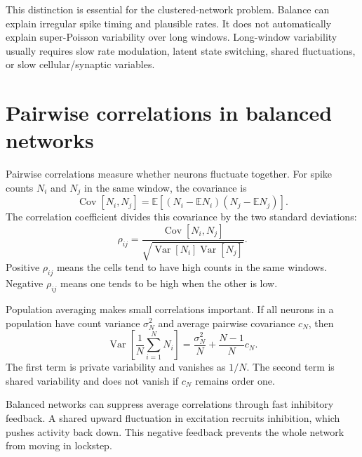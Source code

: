 This distinction is essential for the clustered-network problem. Balance can explain irregular spike timing and plausible rates. It does not automatically explain super-Poisson variability over long windows. Long-window variability usually requires slow rate modulation, latent state switching, shared fluctuations, or slow cellular/synaptic variables.

\section{Pairwise correlations in balanced networks}
\label{sec:pairwise-correlations-balanced}

Pairwise correlations measure whether neurons fluctuate together. For spike counts $N_i$ and $N_j$ in the same window, the covariance is
%
\begin{equation}
  \operatorname{Cov}[N_i,N_j]
  =
  \mathbb{E}\!\left[
    (N_i-\mathbb{E}N_i)(N_j-\mathbb{E}N_j)
  \right].
  \label{eq:count-covariance-balanced}
\end{equation}
%
The correlation coefficient divides this covariance by the two standard deviations:
%
\begin{equation}
  \rho_{ij}
  =
  \frac{\operatorname{Cov}[N_i,N_j]}
       {\sqrt{\operatorname{Var}[N_i]\operatorname{Var}[N_j]}}.
  \label{eq:count-correlation-balanced}
\end{equation}
%
Positive $\rho_{ij}$ means the cells tend to have high counts in the same windows. Negative $\rho_{ij}$ means one tends to be high when the other is low.

Population averaging makes small correlations important. If all neurons in a population have count variance $\sigma_N^2$ and average pairwise covariance $c_N$, then
%
\begin{equation}
  \operatorname{Var}\!\left[\frac{1}{N}\sum_{i=1}^N N_i\right]
  =
  \frac{\sigma_N^2}{N}
  +
  \frac{N-1}{N}c_N .
  \label{eq:population-variance-pairwise-cov}
\end{equation}
%
The first term is private variability and vanishes as $1/N$. The second term is shared variability and does not vanish if $c_N$ remains order one.

Balanced networks can suppress average correlations through fast inhibitory feedback. A shared upward fluctuation in excitation recruits inhibition, which pushes activity back down. This negative feedback prevents the whole network from moving in lockstep.

